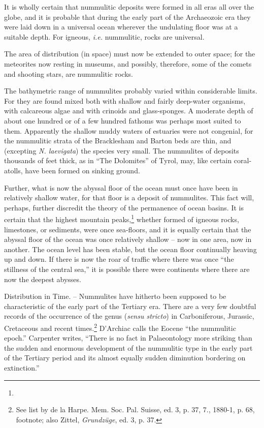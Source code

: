 \documentclass[a4paper, 12pt, oneside]{article}
\begin{document}
It is wholly certain that nummulitic deposits were formed in all eras all over the globe, and it is probable that during the early part of the Archaeozoic era they were laid down in a universal ocean wherever the undulating floor was at a suitable depth. For igneous, \emph{i.e.} nummulitic, rocks are universal.

The area of distribution (in space) must now be extended to outer space; for the meteorites now resting in museums, and possibly, therefore, some of the comets and shooting stars, are nummulitic rocks.

The bathymetric range of nummulites probably varied within considerable limits. For they are found mixed both with shallow and fairly deep-water organisms, with calcareous algae and with crinoids and glass-sponges. A moderate depth of about one hundred or of a few hundred fathoms was perhaps most suited to them. Apparently the shallow muddy waters of estuaries were not congenial, for the nummulitic strata of the Bracklesham and Barton beds are thin, and (excepting \emph{N. laevigata}) the species very small. The nummulites of deposits thousands of feet thick, as in ``The Dolomites'' of Tyrol, may, like certain coral-atolls, have been formed on sinking ground.

Further, what is now the abyssal floor of the ocean must once have been in relatively shallow water, for that floor is a deposit of nummulites. This fact will, perhaps, further discredit the theory of the permanence of ocean basins. It is certain that the highest mountain peaks,\footnote{} whether formed of igneous rocks, limestones, or sediments, were once sea-floors, and it is equally certain that the abyssal floor of the ocean was once relatively shallow -- now in one area, now in another. The ocean level has been stable, but the ocean floor continually heaving up and down. If there is now the roar of traffic where there was once ``the stillness of the central sea,'' it is possible there were continents where there are now the deepest abysses.

Distribution in Time. -- Nummulites have hitherto been supposed to be characteristic of the early part of the Tertiary era. There are a very few doubtful records of the occurrence of the genus (\emph{sensu stricto}) in Carboniferous, Jurassic, Cretaceous and recent times.\footnote{See list by de la Harpe. Mem. Soc. Pal. Suisse, ed. 3, p. 37, 7., 1880-1, p. 68, footnote; also Zittel, \emph{Grundzüge}, ed. 3, p. 37.} D'Archiac calls the Eocene ``the nummulitic epoch.'' Carpenter writes, ``There is no fact in Palaeontology more striking than the sudden and enormous development of the nummulitic type in the early part of the Tertiary period and its almost equally sudden diminution bordering on extinction.''
\end{document}
